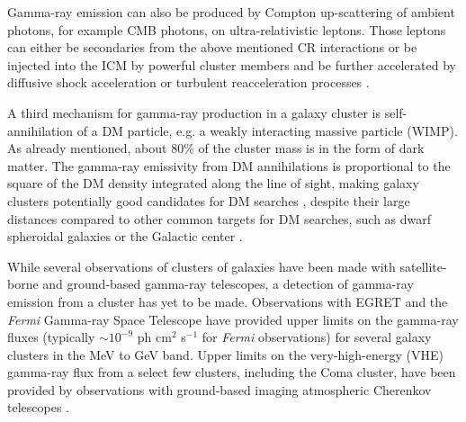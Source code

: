 \documentclass[12pt,manuscript]{aastex}
\def\Fermi{{\em Fermi}\xspace}
\begin{document}
Gamma-ray emission can also be produced by Compton up-scattering of ambient photons, for example
CMB photons, on ultra-relativistic leptons. Those leptons can either be secondaries from the above
mentioned CR interactions or be injected into the ICM by powerful cluster members and be further
accelerated by diffusive shock acceleration or turbulent reacceleration processes
\citep[][and references therein]{article:SchlickeiserSieversThiemann:1987}.

A third mechanism for gamma-ray production in a galaxy cluster is self-annihilation of a DM
particle, e.g. a weakly interacting massive particle (WIMP). As already mentioned, about 80\% of
the cluster mass is in the form of dark matter. The gamma-ray emissivity from DM annihilations is
proportional to the square of the DM density integrated along the line of sight, making galaxy
clusters potentially good candidates for DM searches \citep{article:EvansFerrerSarkar:2004,
article:BergstromHooper:2006, article:PinzkePfrommerBergstrom2009, article:Cuesta_etal:2011},
despite their large distances compared to other common targets for DM searches, such as dwarf
spheroidal galaxies \citep{article:Strigari_etal:2007, article:Acciari_etal:2010,
article:Aliu_etal:2009} or the Galactic center \citep{article:Kosack_etal:2004,
article:Aharonian_etal:2006, article:Aharonian_etal:2009b, article:Abramowski_etal:2011}. 

While several observations of clusters of galaxies have been made with satellite-borne and
ground-based gamma-ray telescopes, a detection of gamma-ray emission from a cluster has yet to be
made. Observations with EGRET \citep{article:Sreekumar_etal:1996, article:Reimer_etal:2003} and the
\Fermi Gamma-ray Space Telescope \citep{article:Ackermann_etal:2010} have provided upper limits on
the gamma-ray fluxes (typically $\sim10^{-9}$ ph cm$^{2}$ s$^{-1}$ for \Fermi observations) for
several galaxy clusters in the MeV to GeV band. Upper limits on the very-high-energy (VHE)
gamma-ray flux from a select few clusters, including the Coma cluster, have been provided by
observations with ground-based imaging atmospheric Cherenkov telescopes
\citep[IACTs;][]{article:Perkins_etal:2006, inproc:Perkins_etal:2008, article:Aharonian_etal:2009a,
article:Aleksic_etal:2010}.
\end{document}
